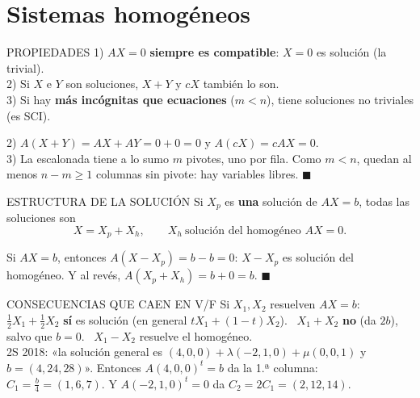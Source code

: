 \section{Sistemas homogéneos}
\begin{sello}{PROPIEDADES}
1) $AX=0$ \textbf{siempre es compatible}: $X=0$ es solución (la trivial).\\
2) Si $X$ e $Y$ son soluciones, $X+Y$ y $cX$ también lo son.\\
3) Si hay \textbf{más incógnitas que ecuaciones} ($m<n$), tiene soluciones no triviales (es SCI).
\end{sello}
\begin{demo}
2) $A(X+Y)=AX+AY=0+0=0$ y $A(cX)=cAX=0$.\\
3) La escalonada tiene a lo sumo $m$ pivotes, uno por fila. Como $m<n$, quedan al menos $n-m\ge1$ columnas sin pivote: hay variables libres. $\blacksquare$
\end{demo}
\begin{sello}{ESTRUCTURA DE LA SOLUCIÓN}
Si $X_p$ es \textbf{una} solución de $AX=b$, todas las soluciones son
\[X=X_p+X_h,\qquad X_h\ \text{solución del homogéneo } AX=0.\]
\end{sello}
\begin{demo}
Si $AX=b$, entonces $A(X-X_p)=b-b=0$: $X-X_p$ es solución del homogéneo. Y al revés, $A(X_p+X_h)=b+0=b$. $\blacksquare$
\end{demo}
\begin{memo}{CONSECUENCIAS QUE CAEN EN V/F}
Si $X_1,X_2$ resuelven $AX=b$: \ $\frac12X_1+\frac12X_2$ \textbf{sí} es solución (en general $tX_1+(1-t)X_2$). \ $X_1+X_2$ \textbf{no} (da $2b$), salvo que $b=0$. \ $X_1-X_2$ resuelve el homogéneo.\\[2pt]
2S 2018: «la solución general es $(4,0,0)+\lambda(-2,1,0)+\mu(0,0,1)$ y $b=(4,24,28)$». Entonces $A(4,0,0)^t=b$ da la 1.ª columna: $C_1=\frac b4=(1,6,7)$. Y $A(-2,1,0)^t=0$ da $C_2=2C_1=(2,12,14)$.
\end{memo}


